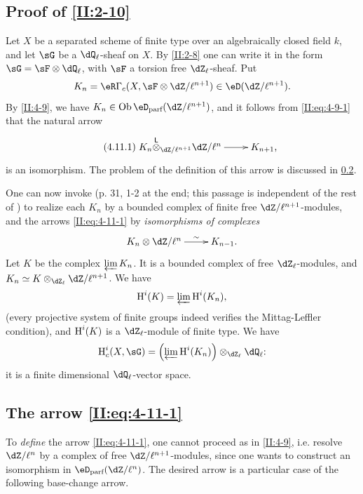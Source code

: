 \subsection{Proof of \texorpdfstring{\ref{II:2-10}}{2.10}}\label{II:4-11}

Let $X$ be a separated scheme of finite type over an algebraically closed
field $k$, and let $\sG$ be a $\dQ_\ell$-sheaf on $X$. By \ref{II:2-8} one
can write it in the form $\sG=\sF\otimes\dQ_\ell$, with $\sF$ a
torsion free $\dZ_\ell$-sheaf. Put
\[
  K_n = \eR \Gamma_c(X,\sF\otimes\dZ/\ell^{n+1})\in\eD(\dZ/\ell^{n+1}) \text{.}
\]
By \ref{II:4-9}, we have $K_n\in\ob\eD_\text{parf}(\dZ/\ell^{n+1})$, and it
follows from \eqref{II:eq:4-9-1} that the natural arrow
\begin{equation*}\tag{4.11.1}\label{II:eq:4-11-1}
\xymatrix{
  K_n\lotimes_{\dZ/\ell^{n+1}} \dZ/\ell^n \ar[r] & K_{n+1} \text{,}
}
\end{equation*}
is an isomorphism. The problem of the definition of this arrow is
discussed in \ref{II:4-12}.

One can now invoke \cite[XI.3.3]{sga5} (p. 31, 1-2 at the end; this
passage is independent of the rest of \cite{sga5}) to realize each
$K_n$ by a bounded complex of finite free $\dZ/\ell^{n+1}$-modules,
and the arrows \eqref{II:eq:4-11-1} by \emph{isomorphisms of complexes}
\[\xymatrix{
  K_n\otimes \dZ/\ell^n \ar[r]^-\sim
    & K_{n-1} \text{.}
}\]
Let $K$ be the complex $\varprojlim K_n$. It is a bounded complex of
free $\dZ_\ell$-modules, and $K_n\simeq K\otimes_{\dZ_\ell}\dZ/\ell^{n+1}$. We
have
\[
  \operatorname{H}^i(K) = \varprojlim \operatorname{H}^i(K_n) \text{,}
\]
(every projective system of finite groups indeed verifies the
Mittag-Leffler condition), and $\operatorname{H}^i(K)$ is a $\dZ_\ell$-module of finite type. We have
\[
  \h_c^i(X,\sG) = \left(\varprojlim \h^i(K_n) \right)\otimes_{\dZ_\ell} \dQ_\ell \text{:}
\]
it is a finite dimensional $\dQ_\ell$-vector space.




\subsection{The arrow \texorpdfstring{\eqref{II:eq:4-11-1}}{(4.11.1)}}\label{II:4-12}

To \emph{define} the arrow \eqref{II:eq:4-11-1}, one cannot
proceed as in \ref{II:4-9}, i.e. resolve $\dZ/\ell^n$ by a complex
of free $\dZ/\ell^{n+1}$-modules, since one wants to construct an isomorphism
in $\eD_\text{parf}(\dZ/\ell^n)$. The desired arrow is a particular case of
the following base-change arrow.

